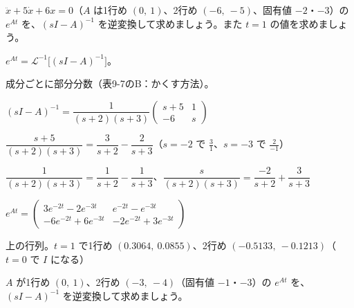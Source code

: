 \begin{reidai}[$(sI-A)^{-1}$ で]
$\ddot x+5\dot x+6x=0$（$A$ は1行め $(0,\ 1)$、2行め $(-6,\ -5)$、固有値 $-2$・$-3$）の $e^{At}$ を、$(sI-A)^{-1}$ を逆変換して求めましょう。また $t=1$ の値を求めましょう。\par
\kangaekata {}\par
{}\enspace $e^{At}=\mathcal L^{-1}\bigl[(sI-A)^{-1}\bigr]$。\par
{}\enspace 成分ごとに部分分数（表9-7のB：かくす方法）。\par
\shiki\kixls{}\zw{} $(sI-A)^{-1}=\dfrac{1}{(s+2)(s+3)}\begin{pmatrix}s+5&1\\-6&s\end{pmatrix}$\par
\kixla $\dfrac{s+5}{(s+2)(s+3)}=\dfrac{3}{s+2}-\dfrac{2}{s+3}$\quad （$s=-2$ で $\frac31$、$s=-3$ で $\frac{2}{-1}$）\par
\kixla $\dfrac{1}{(s+2)(s+3)}=\dfrac{1}{s+2}-\dfrac{1}{s+3}$、$\dfrac{s}{(s+2)(s+3)}=\dfrac{-2}{s+2}+\dfrac{3}{s+3}$\par
\kixla $e^{At}=\begin{pmatrix}3e^{-2t}-2e^{-3t}&e^{-2t}-e^{-3t}\\-6e^{-2t}+6e^{-3t}&-2e^{-2t}+3e^{-3t}\end{pmatrix}$\par
\kotae 上の行列。$t=1$ で1行め $(0.3064,\ 0.0855)$、2行め $(-0.5133,\ -0.1213)$（$t=0$ で $I$ になる）
\end{reidai}

\begin{jibun}
$A$ が1行め $(0,\ 1)$、2行め $(-3,\ -4)$（固有値 $-1$・$-3$）の $e^{At}$ を、$(sI-A)^{-1}$ を逆変換して求めましょう。
\end{jibun}

